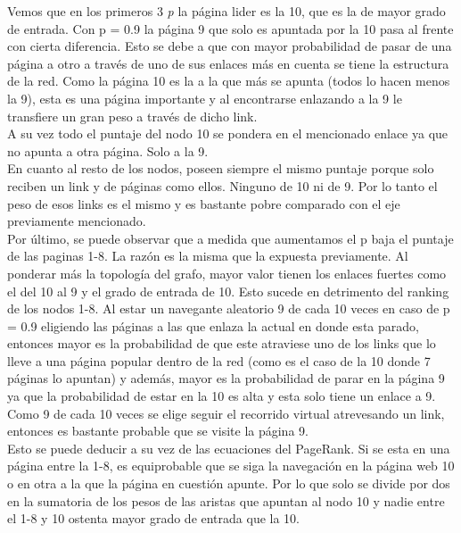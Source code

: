 Vemos que en los primeros 3 \textit{p} la página lider es la 10, que es la de mayor grado de entrada. Con p = 0.9 la página 9 que solo es apuntada por la 10 pasa al frente con cierta diferencia. Esto se debe a que con mayor probabilidad de pasar de una página a otro a través de uno de sus enlaces más en cuenta se tiene la estructura de la red. Como la página 10 es la a la que más se apunta (todos lo hacen menos la 9), esta es una página importante y al encontrarse enlazando a la 9 le transfiere un gran peso a través de dicho link. \\

A su vez todo el puntaje del nodo 10 se pondera en el mencionado enlace ya que no apunta a otra página. Solo a la 9. \\
En cuanto al resto de los nodos, poseen siempre el mismo puntaje porque solo reciben un link y de páginas como ellos. Ninguno de 10 ni de 9. Por lo tanto el peso de esos links es el mismo y es bastante pobre comparado con el eje previamente mencionado. \\

Por último, se puede observar que a medida que aumentamos el p baja el puntaje de las paginas 1-8. La razón es la misma que la expuesta previamente. Al ponderar más la topología del grafo, mayor valor tienen los enlaces fuertes como el del 10 al 9 y el grado de entrada de 10. Esto sucede en detrimento del ranking de los nodos 1-8. Al estar un navegante aleatorio 9 de cada 10 veces en caso de p = 0.9 eligiendo las páginas a las que enlaza la actual en donde esta parado, entonces mayor es la probabilidad de que este atraviese uno de los links que lo lleve a una página popular dentro de la red (como es el caso de la 10 donde 7 páginas lo apuntan) y además, mayor es la probabilidad de parar en la página 9 ya que la probabilidad de estar en la 10 es alta y esta solo tiene un enlace a 9. Como 9 de cada 10 veces se elige seguir el recorrido virtual atrevesando un link, entonces es bastante probable que se visite la página 9. \\

Esto se puede deducir a su vez de las ecuaciones del PageRank. Si se esta en una página entre la 1-8, es equiprobable que se siga la navegación en la página web 10 o en otra a la que la página en cuestión apunte. Por lo que solo se divide por dos en la sumatoria de los pesos de las aristas que apuntan al nodo 10 y nadie entre el 1-8 y 10 ostenta mayor grado de entrada que la 10. \\

